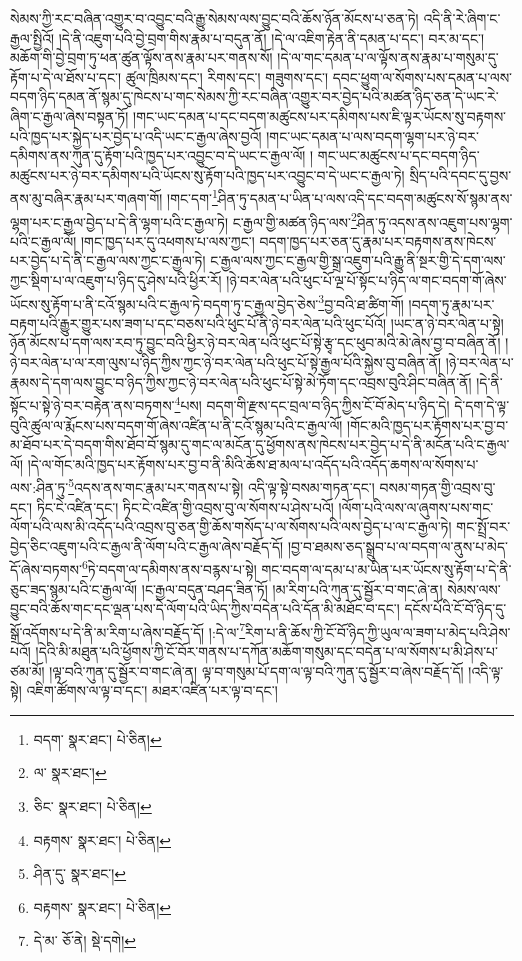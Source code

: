 སེམས་ཀྱི་རང་བཞིན་འགྱུར་བ་འབྱུང་བའི་རྒྱུ་སེམས་ལས་བྱུང་བའི་ཆོས་ཉོན་མོངས་པ་ཅན་ཏེ། འདི་ནི་རེ་ཞིག་ང་རྒྱལ་སྤྱིའོ། །དེ་ནི་འཇུག་པའི་བྱེ་བྲག་གིས་རྣམ་པ་བདུན་ནོ། །དེ་ལ་འཇིག་རྟེན་ནི་དམན་པ་དང་། བར་མ་དང་། མཆོག་གི་བྱེ་བྲག་ཏུ་ཕན་ཚུན་ལྟོས་ནས་རྣམ་པར་གནས་སོ། །དེ་ལ་གང་དམན་པ་ལ་ལྟོས་ནས་རྣམ་པ་གསུམ་དུ་རྟོག་པ་དེ་ལ་ཐོས་པ་དང་། ཚུལ་ཁྲིམས་དང་། རིགས་དང་། གཟུགས་དང་། དབང་ཕྱུག་ལ་སོགས་པས་དམན་པ་ལས་བདག་ཉིད་དམན་ནོ་སྙམ་དུ་ཁེངས་པ་གང་སེམས་ཀྱི་རང་བཞིན་འགྱུར་བར་བྱེད་པའི་མཚན་ཉིད་ཅན་དེ་ཡང་རེ་ཞིག་ང་རྒྱལ་ཞེས་བསྟན་ཏོ། །གང་ཡང་དམན་པ་དང་བདག་མཚུངས་པར་དམིགས་པས་ཇི་ལྟར་ཡོངས་སུ་བརྟགས་པའི་ཁྱད་པར་སྐྱེད་པར་བྱེད་པ་འདི་ཡང་ང་རྒྱལ་ཞེས་བྱའོ། །གང་ཡང་དམན་པ་ལས་བདག་ལྷག་པར་ཉེ་བར་དམིགས་ནས་ཀུན་དུ་རྟོག་པའི་ཁྱད་པར་འབྱུང་བ་དེ་ཡང་ང་རྒྱལ་ལོ། །
གང་ཡང་མཚུངས་པ་དང་བདག་ཉིད་མཚུངས་པར་ཉེ་བར་དམིགས་པའི་ཡོངས་སུ་རྟོག་པའི་ཁྱད་པར་འབྱུང་བ་དེ་ཡང་ང་རྒྱལ་ཏེ། སྲིད་པའི་དབང་དུ་བྱས་ནས་མུ་བཞིར་རྣམ་པར་གཞག་གོ། །གང་དག་\footnote{བདག་  སྣར་ཐང་།  པེ་ཅིན། }ཤིན་ཏུ་དམན་པ་ཡིན་པ་ལས་འདི་དང་བདག་མཚུངས་སོ་སྙམ་ནས་ལྷག་པར་ང་རྒྱལ་བྱེད་པ་དེ་ནི་ལྷག་པའི་ང་རྒྱལ་ཏེ། ང་རྒྱལ་གྱི་མཚན་ཉིད་ལས་\footnote{ལ་  སྣར་ཐང་། }ཤིན་ཏུ་འདས་ནས་འཇུག་པས་ལྷག་པའི་ང་རྒྱལ་ལོ། །གང་ཁྱད་པར་དུ་འཕགས་པ་ལས་ཀྱང་། བདག་ཁྱད་པར་ཅན་དུ་རྣམ་པར་བརྟགས་ནས་ཁེངས་པར་བྱེད་པ་དེ་ནི་ང་རྒྱལ་ལས་ཀྱང་ང་རྒྱལ་ཏེ། ང་རྒྱལ་ལས་ཀྱང་ང་རྒྱལ་གྱི་སྒྲ་འཇུག་པའི་རྒྱུ་ནི་སྔར་གྱི་དེ་དག་ལས་ཀྱང་སྡིག་པ་ལ་འཇུག་པ་ཉིད་དུ་ཤེས་པའི་ཕྱིར་རོ། །ཉེ་བར་ལེན་པའི་ཕུང་པོ་ལྔ་པོ་སྟོང་པ་ཉིད་ལ་གང་བདག་གོ་ཞེས་ཡོངས་སུ་རྟོག་པ་ནི་ངའོ་སྙམ་པའི་ང་རྒྱལ་ཏེ་བདག་ཏུ་ང་རྒྱལ་བྱེད་ཅེས་\footnote{ཅིང་  སྣར་ཐང་།  པེ་ཅིན། }བྱ་བའི་ཐ་ཚིག་གོ། །བདག་ཏུ་རྣམ་པར་བརྟག་པའི་རྒྱུར་གྱུར་པས་ཟག་པ་དང་བཅས་པའི་ཕུང་པོ་ནི་ཉེ་བར་ལེན་པའི་ཕུང་པོའོ། །ཡང་ན་ཉེ་བར་ལེན་པ་སྟེ། ཉོན་མོངས་པ་དག་ལས་རབ་ཏུ་བྱུང་བའི་ཕྱིར་ཉེ་བར་ལེན་པའི་ཕུང་པོ་སྟེ་རྩྭ་དང་ཕུབ་མའི་མེ་ཞེས་བྱ་བ་བཞིན་ནོ། །ཉེ་བར་ལེན་པ་ལ་རག་ལུས་པ་ཉིད་ཀྱིས་ཀྱང་ཉེ་བར་ལེན་པའི་ཕུང་པོ་སྟེ་རྒྱལ་པོའི་སྐྱེས་བུ་བཞིན་ནོ། །ཉེ་བར་ལེན་པ་རྣམས་དེ་དག་ལས་བྱུང་བ་ཉིད་ཀྱིས་ཀྱང་ཉེ་བར་ལེན་པའི་ཕུང་པོ་སྟེ་མེ་ཏོག་དང་འབྲས་བུའི་ཤིང་བཞིན་ནོ། །དེ་ནི་སྟོང་པ་སྟེ་ཉེ་བར་བརྟེན་ནས་བཏགས་\footnote{བརྟགས་  སྣར་ཐང་།  པེ་ཅིན། }པས། བདག་གི་རྫས་དང་བྲལ་བ་ཉིད་ཀྱིས་ངོ་བོ་མེད་པ་ཉིད་དེ། དེ་དག་དེ་ལྟ་བུའི་ཚུལ་ལ་རྨོངས་པས་བདག་གོ་ཞེས་འཛིན་པ་ནི་ངའོ་སྙམ་པའི་ང་རྒྱལ་ལོ། །གོང་མའི་ཁྱད་པར་རྟོགས་པར་བྱ་བ་མ་ཐོབ་པར་དེ་བདག་གིས་ཐོབ་བོ་སྙམ་དུ་གང་ལ་མངོན་དུ་ཕྱོགས་ནས་ཁེངས་པར་བྱེད་པ་དེ་ནི་མངོན་པའི་ང་རྒྱལ་ལོ། །དེ་ལ་གོང་མའི་ཁྱད་པར་རྟོགས་པར་བྱ་བ་ནི་མིའི་ཆོས་ཐ་མལ་པ་འདོད་པའི་འདོད་ཆགས་ལ་སོགས་པ་ལས་:ཤིན་ཏུ་\footnote{ཤིན་དུ་  སྣར་ཐང་། }འདས་ནས་གང་རྣམ་པར་གནས་པ་སྟེ། འདི་ལྟ་སྟེ་བསམ་གཏན་དང་། བསམ་གཏན་གྱི་འབྲས་བུ་དང་། ཏིང་ངེ་འཛིན་དང་། ཏིང་ངེ་འཛིན་གྱི་འབྲས་བུ་ལ་སོགས་པ་ཤེས་པའོ། །ལོག་པའི་ལས་ལ་ཞུགས་པས་གང་ལོག་པའི་ལས་མི་འདོད་པའི་འབྲས་བུ་ཅན་གྱི་ཆོས་གསོད་པ་ལ་སོགས་པའི་ལས་བྱེད་པ་ལ་ང་རྒྱལ་ཏེ། གང་སྤྲོ་བར་བྱེད་ཅིང་འཇུག་པའི་ང་རྒྱལ་ནི་ལོག་པའི་ང་རྒྱལ་ཞེས་བརྗོད་དོ། །བྱ་བ་ཐམས་ཅད་སྒྲུབ་པ་ལ་བདག་ལ་ནུས་པ་མེད་དོ་ཞེས་བཏགས་\footnote{བརྟགས་  སྣར་ཐང་།  པེ་ཅིན། }ཏེ་བདག་ལ་དམིགས་ནས་བརྙས་པ་སྟེ། གང་བདག་ལ་དམ་པ་མ་ཡིན་པར་ཡོངས་སུ་རྟོག་པ་དེ་ནི་ཅུང་ཟད་སྙམ་པའི་ང་རྒྱལ་ལོ། །ང་རྒྱལ་བདུན་བཤད་ཟིན་ཏོ། །མ་རིག་པའི་ཀུན་དུ་སྦྱོར་བ་གང་ཞེ་ན། སེམས་ལས་བྱུང་བའི་ཆོས་གང་དང་ལྡན་པས་དེ་ལོག་པའི་ཡིད་ཀྱིས་བདེན་པའི་དོན་མི་མཐོང་བ་དང་། དངོས་པོའི་ངོ་བོ་ཉིད་དུ་སྒྲོ་འདོགས་པ་དེ་ནི་མ་རིག་པ་ཞེས་བརྗོད་དོ། །:དེ་ལ་\footnote{དེ་མ་  ཅོ་ནེ།  སྡེ་དགེ། }རིག་པ་ནི་ཆོས་ཀྱི་ངོ་བོ་ཉིད་ཀྱི་ཡུལ་ལ་ཟག་པ་མེད་པའི་ཤེས་པའོ། །དེའི་མི་མཐུན་པའི་ཕྱོགས་ཀྱི་ངོ་བོར་གནས་པ་དཀོན་མཆོག་གསུམ་དང་བདེན་པ་ལ་སོགས་པ་མི་ཤེས་པ་ཙམ་མོ། །ལྟ་བའི་ཀུན་དུ་སྦྱོར་བ་གང་ཞེ་ན། ལྟ་བ་གསུམ་པོ་དག་ལ་ལྟ་བའི་ཀུན་དུ་སྦྱོར་བ་ཞེས་བརྗོད་དོ། །འདི་ལྟ་སྟེ། འཇིག་ཚོགས་ལ་ལྟ་བ་དང་། མཐར་འཛིན་པར་ལྟ་བ་དང་། 